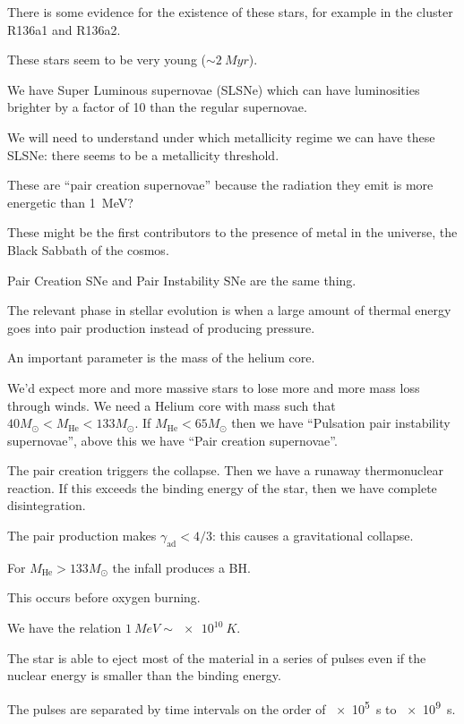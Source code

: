 \documentclass[main.tex]{subfiles}
\begin{document}
There is some evidence for the existence of these stars, for example in the cluster R136a1  and R136a2. 

These stars seem to be very young (\(\sim \SI{2}{Myr}\)). 

We have Super Luminous supernovae (SLSNe) which can have luminosities brighter by a factor of 10 than the regular supernovae. 

We will need to understand under which metallicity regime we can have these SLSNe: there seems to be a metallicity threshold.  

These are ``pair creation supernovae'' because the radiation they emit is more energetic than \SI{1}{MeV}? 

These might be the first contributors to the presence of metal in the universe, the Black Sabbath of the cosmos. 

Pair Creation SNe and Pair Instability SNe are the same thing. 

The relevant phase in stellar evolution is when a large amount of thermal energy goes into pair production instead of producing pressure. 

An important parameter is the mass of the helium core. 

We'd expect more and more massive stars to lose more and more mass loss through winds. 
We need a Helium core with mass such that \(40 M_{\odot} < M _{\text{He}} < 133 M_{\odot}\). If \(M _{\text{He}} < 65 M_{\odot}\) then we have ``Pulsation pair instability supernovae'', above this we have ``Pair creation supernovae''. 

The pair creation triggers the collapse. Then we have a runaway thermonuclear reaction. If this exceeds the binding energy of the star, then we have complete disintegration. 


The pair production makes \(\gamma _{\text{ad}} < 4/3\): this causes a gravitational collapse. 

For \(M _{\text{He}} > 133 M_{\odot}\) the infall produces a BH.

This occurs before oxygen burning. 

We have the relation \(\SI{1}{MeV} \sim \SI{e10}{K}\). 

The star is able to eject most of the material in a series of pulses even if the nuclear energy is smaller than the binding energy. 

The pulses are separated by time intervals on the order of \SI{e5}{s} to \SI{e9}{s}. 
\end{document}
